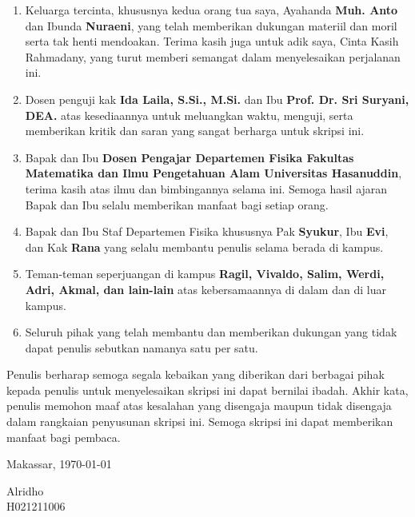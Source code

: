 \begin{enumerate}
  \item Keluarga tercinta, khususnya kedua orang tua saya, Ayahanda
    \textbf{Muh. Anto} dan Ibunda \textbf{Nuraeni}, yang telah
    memberikan dukungan materiil dan moril serta tak henti mendoakan.
    Terima kasih juga untuk adik saya, Cinta Kasih Rahmadany, yang
    turut memberi semangat dalam menyelesaikan perjalanan ini.
  \item Dosen penguji kak \textbf{Ida Laila, S.Si., M.Si.} dan Ibu
    \textbf{Prof. Dr. Sri Suryani, DEA.} atas kesediaannya untuk
    meluangkan waktu, menguji, serta memberikan kritik dan saran yang
    sangat berharga untuk skripsi ini.
  \item Bapak dan Ibu \textbf{Dosen Pengajar Departemen Fisika Fakultas
    Matematika dan Ilmu Pengetahuan Alam Universitas Hasanuddin},
    terima kasih atas ilmu dan bimbingannya selama ini. Semoga hasil
    ajaran Bapak dan Ibu selalu memberikan manfaat bagi setiap orang.
  \item Bapak dan Ibu Staf Departemen Fisika khususnya Pak \textbf{Syukur},
    Ibu \textbf{Evi}, dan Kak \textbf{Rana} yang selalu membantu penulis
    selama berada di kampus.
  \item Teman-teman seperjuangan di kampus \textbf{Ragil, Vivaldo, Salim,
    Werdi, Adri, Akmal, dan lain-lain} atas kebersamaannya di dalam
    dan di luar kampus.
  \item Seluruh pihak yang telah membantu dan memberikan dukungan
    yang tidak dapat penulis sebutkan namanya satu per satu.
\end{enumerate}

Penulis berharap semoga segala kebaikan yang diberikan dari berbagai
pihak kepada penulis untuk menyelesaikan skripsi ini dapat bernilai
ibadah. Akhir kata, penulis memohon maaf atas kesalahan yang
disengaja maupun tidak disengaja dalam rangkaian penyusunan skripsi
ini. Semoga skripsi ini dapat memberikan manfaat bagi pembaca.

\vspace{2cm}

\hfill
\begin{minipage}{0.4\textwidth}
  \raggedleft
  Makassar, \today \par
  \vspace{2cm}
  Alridho \\
  H021211006
\end{minipage}
\endgroup

